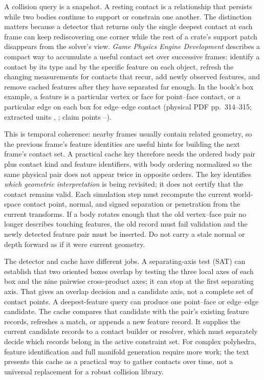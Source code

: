 A collision query is a snapshot. A resting contact is a relationship that persists while two bodies continue to support or constrain one another. The distinction matters because a detector that returns only the single deepest contact at each frame can keep rediscovering one corner while the rest of a crate's support patch disappears from the solver's view. \emph{Game Physics Engine Development} describes a compact way to accumulate a useful contact set over successive frames: identify a contact by its type and by the specific feature on each object, refresh the changing measurements for contacts that recur, add newly observed features, and remove cached features after they have separated far enough. In the book's box example, a feature is a particular vertex or face for point--face contact, or a particular edge on each box for edge--edge contact (physical PDF pp.~314--315; extracted units , ; claim points --).

This is temporal coherence: nearby frames usually contain related geometry, so the previous frame's feature identities are useful hints for building the next frame's contact set. A practical cache key therefore needs the ordered body pair plus contact kind and feature identifiers, with body ordering normalized so the same physical pair does not appear twice in opposite orders. The key identifies \emph{which geometric interpretation} is being revisited; it does not certify that the contact remains valid. Each simulation step must recompute the current world-space contact point, normal, and signed separation or penetration from the current transforms. If a body rotates enough that the old vertex--face pair no longer describes touching features, the old record must fail validation and the newly detected feature pair must be inserted. Do not carry a stale normal or depth forward as if it were current geometry.

The detector and cache have different jobs. A separating-axis test (SAT) can establish that two oriented boxes overlap by testing the three local axes of each box and the nine pairwise cross-product axes; it can stop at the first separating axis. That gives an overlap decision and a candidate axis, not a complete set of contact points. A deepest-feature query can produce one point--face or edge--edge candidate. The cache compares that candidate with the pair's existing feature records, refreshes a match, or appends a new feature record. It supplies the current candidate records to a contact builder or resolver, which must separately decide which records belong in the active constraint set. For complex polyhedra, feature identification and full manifold generation require more work; the text presents this cache as a practical way to gather contacts over time, not a universal replacement for a robust collision library.

